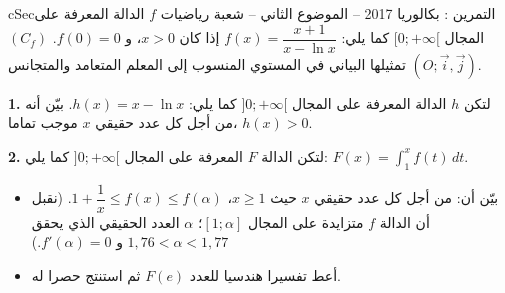 \documentclass[12pt,a4paper]{article}
\newenvironment{BOX}[2]{\begin{otherlanguage}{english}\begin{arbox}{#1}{#2}}{\end{arbox}\end{otherlanguage}}
\newcounter{exo}
\newenvironment{tamrin}[1]{\stepcounter{exo}\begin{BOX}{cSec}{التمرين \theexo: #1}}{\end{BOX}}
\newenvironment{sq}{\begin{itemize}[leftmargin=2.4em,itemsep=3pt]}{\end{itemize}}
\newcommand{\qa}{\item[(أ)]}\newcommand{\qb}{\item[(ب)]}\newcommand{\qc}{\item[(جـ)]}\newcommand{\qd}{\item[(د)]}\newcommand{\qe}{\item[(هـ)]}
\newcommand{\QQ}[1]{\par\smallskip\textbf{#1.} }
\begin{document}
\begin{tamrin}{بكالوريا 2017 -- الموضوع الثاني -- شعبة رياضيات}
$f$ الدالة المعرفة على المجال $[0;+\infty[$ كما يلي: $f(x)=\dfrac{x+1}{x-\ln x}$ إذا كان $x>0$، و $f(0)=0$.
$(C_f)$ تمثيلها البياني في المستوي المنسوب إلى المعلم المتعامد والمتجانس $(O;\vec i,\vec j)$.
\QQ{1} لتكن $h$ الدالة المعرفة على المجال $]0;+\infty[$ كما يلي: $h(x)=x-\ln x$. بيّن أنه من أجل كل عدد حقيقي $x$ موجب تماما، $h(x)>0$.
\QQ{2} لتكن الدالة $F$ المعرفة على المجال $]0;+\infty[$ كما يلي: $F(x)=\displaystyle\int_1^xf(t)\,dt$.
\begin{sq}
\qa بيّن أن: من أجل كل عدد حقيقي $x$ حيث $x\ge1$، $1+\dfrac1x\le f(x)\le f(\alpha)$. (نقبل أن الدالة $f$ متزايدة على المجال $[1;\alpha]$؛ $\alpha$ العدد الحقيقي الذي يحقق $1{,}76<\alpha<1{,}77$ و $f'(\alpha)=0$.)
\qb أعط تفسيرا هندسيا للعدد $F(e)$ ثم استنتج حصرا له.
\end{sq}
\end{tamrin}
\end{document}
